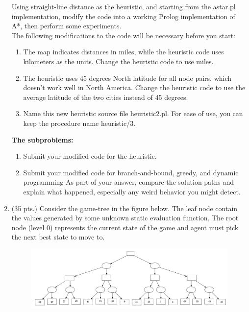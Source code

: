 \documentclass{article}%
\begin{document}
\begin{enumerate}
Using straight-line distance as the heuristic, and starting from the astar.pl implementation, modify the code into a working Prolog implementation of A*, then perform some experiments. \\
The following modifications to the code will be necessary before you start: 
	\begin{enumerate}
  		\item The map indicates distances in miles, while the heuristic code uses kilometers as the units. Change the heuristic code to use miles.
  		\item The heuristic uses 45 degrees North latitude for all node pairs, which doesn't work well in North America. Change the heuristic code to use the average latitude of the two cities instead of 45 degrees.
  		\item Name this new heuristic source file heuristic2.pl. For ease of use, you can keep the procedure name heuristic/3.
	\end{enumerate}
	\textbf{The subproblems: }\\
	\begin{enumerate}
  		\item Submit your modified code for the heuristic. 
		\item Submit your modified code for branch-and-bound, greedy, and dynamic programming As part of your answer, compare the solution paths and explain what happened, especially any weird behavior you might detect. 
	\end{enumerate}
	
	
	\item (35 pts.) Consider the game-tree in the figure below. The leaf node contain the values generated by some unknown static evaluation function. The root node (level 0) represents the current state of the game and agent must pick the next best state to move to.
\begin{figure}[h]
\begin{center}
  \includegraphics[scale=0.3]{tree.png}
\end{center}
\end{figure}


\end{enumerate}
\end{document}
